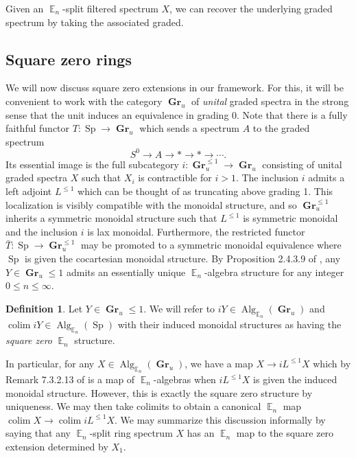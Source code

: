 \documentclass[reqno, oneside]{amsart}
\theoremstyle{definition}
\newtheorem{dfn}[nul]{Definition}
\theoremstyle{plain}
\DeclareMathOperator*{\colim}{\text{colim}}
\DeclareMathOperator{\E}{\mathbb{E}}
\DeclareMathOperator{\Gr}{\textbf{Gr}}
\DeclareMathOperator{\Alg}{\text{Alg}}
\DeclareMathOperator{\Sp}{\text{Sp}}
\begin{document}
Given an $\E_n$-split filtered spectrum $X$, we can recover the underlying graded spectrum by taking the associated graded. 

\subsection{Square zero rings}

We will now discuss square zero extensions in our framework.  For this, it will be convenient to work with the category $\Gr_u$ of \emph{unital} graded spectra in the strong sense that the unit induces an equivalence in grading 0.  
Note that there is a fully faithful functor $T:\Sp \to \Gr_u$ which sends a spectrum $A$ to the graded spectrum $$S^0 \longrightarrow A \longrightarrow * \longrightarrow * \longrightarrow \cdots.$$  Its essential image is the full subcategory $i: \Gr^{\leq 1}_u \to \Gr_u$ consisting of unital graded spectra $X$ such that $X_i$ is contractible for $i>1$.  The inclusion $i$ admits a left adjoint $L^{\leq 1}$ which can be thought of as truncating above grading 1.  This localization is visibly compatible with the monoidal structure, and so $\Gr_u^{\leq 1}$ inherits a symmetric monoidal structure such that $L^{\leq 1}$ is symmetric monoidal and the inclusion $i$ is lax monoidal.  Furthermore, the restricted functor $\bar{T}: \Sp \to \Gr^{\leq 1}_u$ may be promoted to a symmetric monoidal equivalence where $\Sp$ is given the cocartesian monoidal structure.   By Proposition 2.4.3.9 of \cite{HA}, any $Y\in \Gr_u{\leq 1}$ admits an essentially unique $\E_n$-algebra structure for any integer $0\leq n\leq \infty$.  

\begin{dfn}
Let $Y\in \Gr_u{\leq 1}$.  We will refer to $iY\in \Alg_{\E_n}(\Gr_u)$ and $\colim iY\in \Alg_{\E_n}(\Sp)$ with their induced monoidal structures as having the \emph{square zero} $\E_n$ structure.
\end{dfn}

In particular, for any $X\in \Alg_{\E_n}(\Gr_u)$, we have a map $X\to iL^{\leq 1}X$ which by Remark 7.3.2.13 of \cite{HA} is a map of $\E_n$-algebras when $iL^{\leq 1}X$ is given the induced monoidal structure.  However, this is exactly the square zero structure by uniqueness.  We may then take colimits to obtain a canonical $\E_n$ map $\colim X \to \colim iL^{\leq 1}X.$  We may summarize this discussion informally by saying that any $\E_n$-split ring spectrum $X$ has an $\E_n$ map to the square zero extension determined by $X_1$.  
\end{document}
